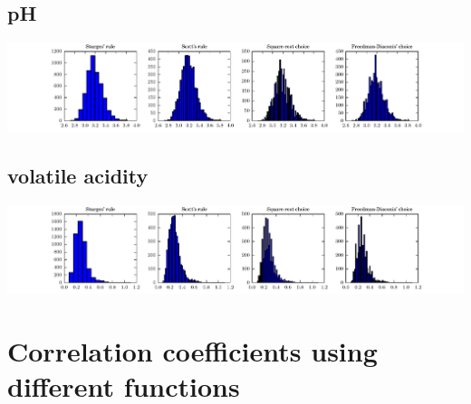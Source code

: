 \documentclass{report}
\begin{document}
\subsection{pH}
\includegraphics{histograms/pH.pdf}

\subsection{volatile acidity}
\includegraphics{histograms/volatile_acidity.pdf}

\section{Correlation coefficients using different functions}
\end{document}
